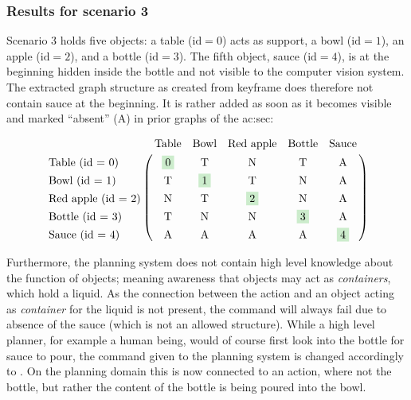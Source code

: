 \subsubsection{Results for scenario 3}

Scenario 3 holds five objects: a table ($\text{id} = 0$) acts as support, a bowl ($\text{id} = 1$), an apple ($\text{id} = 2$), and a bottle ($\text{id} = 3$).
The fifth object, sauce ($\text{id} = 4$), is at the beginning hidden inside the bottle and not visible to the computer vision system.
The extracted graph structure as created from keyframe  does therefore not contain sauce at the beginning.
It is rather added as soon as it becomes visible and marked ``absent'' (A) in prior graphs of the \gls{ac:sec}:

\begin{align*}
  \bordermatrix{
                                & \textup{Table}        & \textup{Bowl}         & \textup{Red apple}    & \textup{Bottle}       & \textup{Sauce}\cr
    \textup{Table (id = 0)}     & \colorbox{green120}{0}& \textup{T}            & \textup{N}            & \textup{T}            & \textup{A}\cr
    \textup{Bowl (id = 1)}      & \textup{T}            & \colorbox{green120}{1}& \textup{T}            & \textup{N}            & \textup{A}\cr
    \textup{Red apple (id = 2)} & \textup{N}            & \textup{T}            & \colorbox{green120}{2}& \textup{N}            & \textup{A}\cr
    \textup{Bottle (id = 3)}    & \textup{T}            & \textup{N}            & \textup{N}            & \colorbox{green120}{3}& \textup{A}\cr
    \textup{Sauce (id = 4)}     & \textup{A}            & \textup{A}            & \textup{A}            & \textup{A}            & \colorbox{green120}{4}\cr
    }
\end{align*}

Furthermore, the planning system does not contain high level knowledge about the function of objects; meaning awareness that objects may act as \emph{containers}, which hold a liquid.
As the connection between the action  and an object acting as \emph{container} for the liquid is not present, the command  will always fail due to absence of the sauce (which is not an allowed structure).
While a high level planner, for example a human being, would of course first look into the bottle for sauce to pour, the command given to the planning system is changed accordingly to .
On the planning domain this is now connected to an action, where not the bottle, but rather the content of the bottle is being poured into the bowl.

